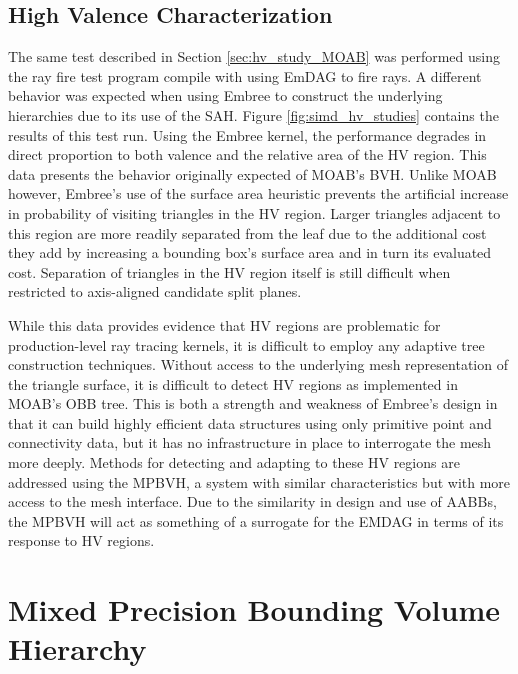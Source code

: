 
\subsection{High Valence Characterization}

The same test described in Section \ref{sec:hv_study_MOAB} was performed using
the ray fire test program compile with using EmDAG to fire rays. A different
behavior was expected when using Embree to construct the underlying hierarchies
due to its use of the SAH. Figure \ref{fig:simd_hv_studies} contains the results
of this test run. Using the Embree kernel, the performance degrades in direct
proportion to both valence and the relative area of the HV region. This data
presents the behavior originally expected of MOAB's BVH. Unlike MOAB however,
Embree's use of the surface area heuristic prevents the artificial increase in
probability of visiting triangles in the HV region. Larger triangles adjacent to
this region are more readily separated from the leaf due to the additional cost
they add by increasing a bounding box's surface area and in turn its evaluated
cost. Separation of triangles in the HV region itself is still difficult when
restricted to axis-aligned candidate split planes.

While this data provides evidence that HV regions are problematic for
production-level ray tracing kernels, it is difficult to employ any adaptive
tree construction techniques. Without access to the underlying mesh
representation of the triangle surface, it is difficult to detect HV regions as
implemented in MOAB's OBB tree. This is both a strength and weakness of Embree's
design in that it can build highly efficient data structures using only
primitive point and connectivity data, but it has no infrastructure in place to
interrogate the mesh more deeply. Methods for detecting and adapting to these HV
regions are addressed using the MPBVH, a system with similar characteristics
but with more access to the mesh interface. Due to the similarity in design and
use of AABBs, the MPBVH will act as something of a surrogate for the EMDAG in
terms of its response to HV regions.

\section{Mixed Precision Bounding Volume Hierarchy}\label{sec:simd_hv_study}

